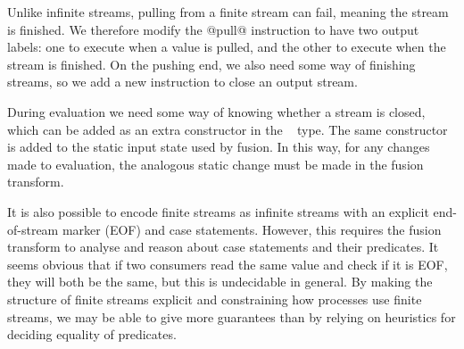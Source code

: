 Unlike infinite streams, pulling from a finite stream can fail, meaning the stream is finished. We therefore modify the @pull@ instruction to have two output labels: one to execute when a value is pulled, and the other to execute when the stream is finished. On the pushing end, we also need some way of finishing streams, so we add a new instruction to close an output stream.

During evaluation we need some way of knowing whether a stream is closed, which can be added as an extra constructor in the \InputState~ type. The same constructor is added to the static input state used by fusion. In this way, for any changes made to evaluation, the analogous static change must be made in the fusion transform.


It is also possible to encode finite streams as infinite streams with an explicit end-of-stream marker (EOF) and case statements. However, this requires the fusion transform to analyse and reason about case statements and their predicates. It seems obvious that if two consumers read the same value and check if it is EOF, they will both be the same, but this is undecidable in general. By making the structure of finite streams explicit and constraining how processes use finite streams, we may be able to give more guarantees than by relying on heuristics for deciding equality of predicates. 

